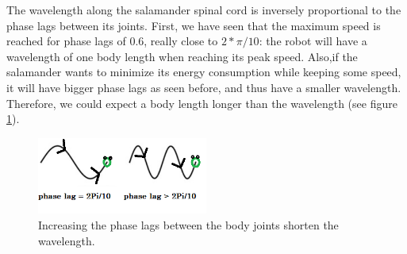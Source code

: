 \documentclass{cmc}
\begin{document}
The wavelength along the salamander spinal cord is inversely proportional to the phase lags between its joints. First, we have seen that the maximum speed is reached for phase lags of 0.6, really close to $2*\pi/10$: the robot will have a wavelength of one body length when reaching its peak speed. Also,if the salamander wants to minimize its energy consumption while keeping some speed, it will have bigger phase lags as seen before, and thus have a smaller wavelength. Therefore, we could expect a body length longer than the wavelength (see figure \ref{fig:wave}).
\begin{figure}[h]
  \centering
  \includegraphics[width=0.5\textwidth]{sinewave.PNG}
  \caption{Increasing the phase lags between the body joints shorten the wavelength.}
  \label{fig:wave}
\end{figure}


\end{document}
